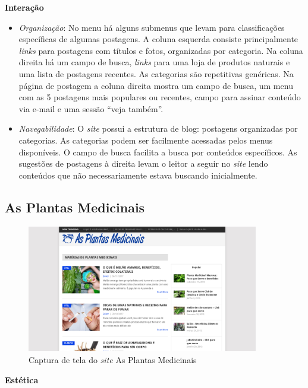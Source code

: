\textbf{Interação}

\begin{itemize}
\item
  \emph{Organização}: No menu há alguns submenus que levam para classificações específicas de algumas postagens. A coluna esquerda consiste principalmente \emph{links} para postagens com títulos e fotos, organizadas por categoria. Na coluna direita há um campo de busca, \emph{links} para uma loja de produtos naturais e uma lista de postagens recentes. As categorias são repetitivas genéricas.
  Na página de postagem a coluna direita mostra um campo de busca, um menu com as 5 postagens mais populares ou recentes, campo para assinar conteúdo via e-mail e uma sessão ``veja também''.
\item
  \emph{Navegabilidade}: O \emph{site} possui a estrutura de blog: postagens organizadas por categorias. As categorias podem ser facilmente acessadas pelos menus disponíveis. O campo de busca facilita a busca por conteúdos específicos. As sugestões de postagens à direita levam o leitor a seguir no \emph{site} lendo conteúdos que não necessariamente estava buscando inicialmente.
\end{itemize}

\subsection{As Plantas Medicinais}\label{as-plantas-medicinais}

\begin{figure}
\centering
\caption{\label{fig-plantasmedicinais}Captura de tela do \emph{site} As Plantas Medicinais}
\includegraphics[width=0.9\textwidth]{images/similares/asplantasmedicinais.png}
\end{figure}

\textbf{Estética}


